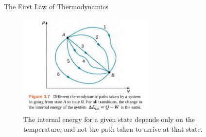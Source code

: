 \documentclass{beamer}
\begin{document}
\begin{frame}{The First Law of Thermodynamics}
\begin{figure}
\centering
\includegraphics[width=0.6\textwidth]{figures/states1.png}
\caption{\label{fig:states} The internal energy for a given state depends only on the temperature, and not the path taken to arrive at that state.}
\end{figure}
\end{frame}
\end{document}
